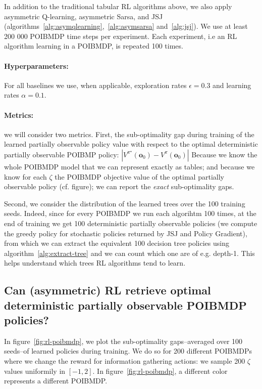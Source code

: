 In addition to the traditional tabular RL algorithms above, we also apply asymmetric Q-learning, asymmetric Sarsa, and JSJ (algorithms~\ref{alg:asymqlearning},~\ref{alg:asymsarsa} and~\ref{alg:jsj}).
We use at least 200 000 POIBMDP time steps per experiment. Each experiment, i.e an RL algorithm learning in a POIBMDP, is repeated 100 times.  

\paragraph{Hyperparameters:} For all baselines we use, when applicable, exploration rates $\epsilon=0.3$ and learning rates $\alpha=0.1$.

\paragraph{Metrics:} we will consider two metrics.
First, the sub-optimality gap during training of the learned partially observable policy value with respect to the optimal deterministic partially observable POIBMP policy: $|V^\pi^{\star}(\boldsymbol{o}_0) - V^\pi(\boldsymbol{o}_0)|$
Because we know the whole POIBMDP model that we can represent exactly as tables; and because we know for each $\zeta$ the POIBMDP objective value of the optimal partially observable policy (cf. figure); we can report the \textit{exact} sub-optimality gaps.

Second, we consider the distribution of the learned trees over the 100 training seeds.
Indeed, since for every POIBMDP we run each algorihtm 100 times, at the end of training we get 100 deterministic partially observable policies (we compute the greedy policy for stochastic policies returned by JSJ and Policy Gradient), from which we can extract the equivalent 100 decision tree policies using algorithm~\ref{alg:extract-tree} and we can count which one are of e.g. depth-1.
This helps understand which trees RL algorithms tend to learn.

\subsection{Can (asymmetric) RL retrieve optimal deterministic partially observable POIBMDP policies?}

In figure~\ref{fig:rl-poibmdp}, we plot the sub-optimality gaps--averaged over 100 seeds--of learned policies during training.
We do so for 200 different POIBMDPs where we change the reward for information gathering actions: we sample 200 $\zeta$ values uniformily in $[-1, 2]$.
In figure~\ref{fig:rl-poibmdp}, a different color represents a different POIBMDP.

